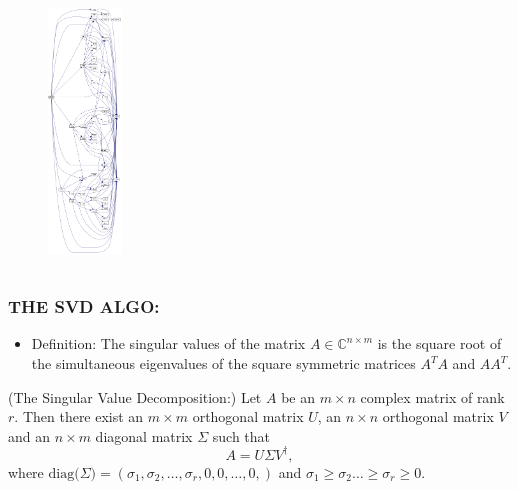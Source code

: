 \documentclass[a4paper,8pt]{beamer} %
\newcommand{\diag}[1]{\text{diag}{#1}}
\begin{document}
\begin{frame}
\begin{columns}[l]
%
\column{2.8cm}
%
\begin{figure}%
\begin{center}
\includegraphics[height=6.5cm]{callg_dsyev.png} 
\end{center}
\end{figure}
%
\end{columns}
\end{frame}%

\begin{frame} %
\frametitle{THE SVD ALGO:}
\begin{itemize}
	\item Definition: 
				The singular values of the matrix $A\in\mathbb C^{n\times m}$ is the 
				square root of the simultaneous eigenvalues of the square symmetric matrices $A^TA$ and $AA^T$.
\end{itemize}
		\begin{theorem}(The Singular Value Decomposition:)
			Let $A$ be an $m\times n$ complex matrix of rank $r$. Then there exist an $m\times m$
			orthogonal matrix $U$, an $n\times n$ orthogonal matrix $V$ and an $n\times m$ diagonal 
			matrix $\Sigma$ such that 
			\begin{equation}
				A = U \Sigma V^\dagger,
			\end{equation}
			where $\diag (\Sigma) = (\sigma_1,\sigma_2,\dots,\sigma_r, 0,0,\dots,0,)$ and 
			$\sigma_1\ge\sigma_2\dots\ge\sigma_r\ge0$.
		\end{theorem}
\end{frame}%
\end{document}
